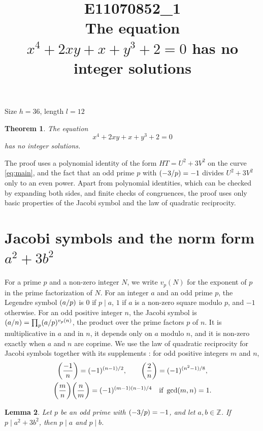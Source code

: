 \documentclass[11pt]{article}
\title{\textbf{E11070852\_1}\\[4pt] {\Large The equation $x^{4}+2xy+x+y^{3}+2=0$ has no integer solutions}}
\author{}
\date{}
\newtheorem{theorem}{Theorem}
\newtheorem{lemma}[theorem]{Lemma}
\newcommand{\Z}{\mathbb{Z}}
\newcommand{\leg}[2]{\mathchoice{\biggl(\dfrac{#1}{#2}\biggr)}{(#1/#2)}{(#1/#2)}{(#1/#2)}}
\begin{document}
\maketitle
\vspace{-8ex}
\begin{center}
Size $h=36$, length $l=12$
\end{center}

\begin{theorem}\label{thm:main}
The equation
\begin{equation}\label{eq:main}
x^{4}+2xy+x+y^{3}+2=0
\end{equation}
has no integer solutions.
\end{theorem}

The proof uses a polynomial identity of the form $HT=U^2+3V^2$ on the curve \eqref{eq:main}, and the fact that an odd prime $p$ with $\leg{-3}{p}=-1$ divides $U^2+3V^2$ only to an even power. Apart from polynomial identities, which can be checked by expanding both sides, and finite checks of congruences, the proof uses only basic properties of the Jacobi symbol and the law of quadratic reciprocity.

\section{\texorpdfstring{Jacobi symbols and the norm form $a^2+3b^2$}{Jacobi symbols and the norm form}}

For a prime $p$ and a non-zero integer $N$, we write $v_p(N)$ for the exponent of $p$ in the prime factorization of $N$. For an integer $a$ and an odd prime $p$, the Legendre symbol $\leg{a}{p}$ is $0$ if $p\mid a$, $1$ if $a$ is a non-zero square modulo $p$, and $-1$ otherwise. For an odd positive integer $n$, the Jacobi symbol is $\leg{a}{n}=\prod_p\leg{a}{p}^{v_p(n)}$, the product over the prime factors $p$ of $n$. It is multiplicative in $a$ and in $n$, it depends only on $a$ modulo $n$, and it is non-zero exactly when $a$ and $n$ are coprime. We use the law of quadratic reciprocity for Jacobi symbols together with its supplements \cite[Chapter~5, \S2]{IR}: for odd positive integers $m$ and $n$,
\begin{gather*}
\leg{-1}{n}=(-1)^{(n-1)/2},\qquad\leg{2}{n}=(-1)^{(n^2-1)/8},\\
\leg{m}{n}\leg{n}{m}=(-1)^{(m-1)(n-1)/4}\quad\text{if }\gcd(m,n)=1.
\end{gather*}

\begin{lemma}\label{lem:divides}
Let $p$ be an odd prime with $\leg{-3}{p}=-1$, and let $a,b\in\Z$. If $p\mid a^2+3b^2$, then $p\mid a$ and $p\mid b$.
\end{lemma}
\end{document}
